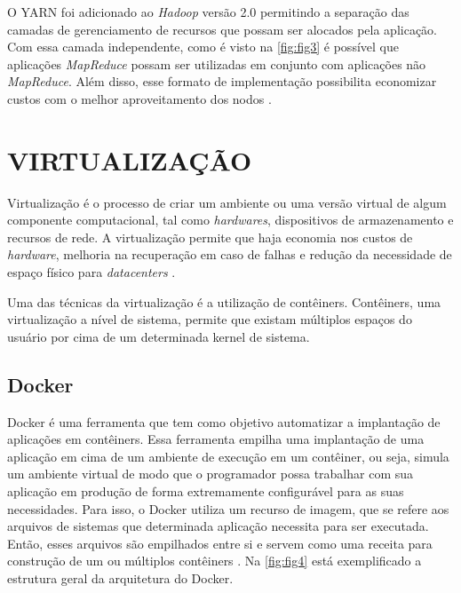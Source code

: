 O YARN foi adicionado ao \textit{Hadoop} versão 2.0 permitindo a separação das camadas de gerenciamento de recursos que possam ser alocados pela aplicação. Com essa camada independente, como é visto na \autoref{fig:fig3} é possível que aplicações \textit{MapReduce} possam ser utilizadas em conjunto com aplicações não \textit{MapReduce}. Além disso, esse formato de implementação possibilita economizar custos com o melhor aproveitamento dos nodos \cite{KobylinskaMartins14}. 


\newpage
\section{VIRTUALIZAÇÃO} \label{sec:virtualizacao}

Virtualização é o processo de criar um ambiente ou uma versão virtual de algum componente computacional, tal como \textit{hardwares}, dispositivos de armazenamento e recursos de rede. A virtualização permite que haja economia nos custos de \textit{hardware}, melhoria na recuperação em caso de falhas e redução da necessidade de espaço físico para \textit{datacenters} \cite{PortnoyVirtualization12}. 

Uma das técnicas da virtualização é a utilização de contêiners. Contêiners, uma virtualização a nível de sistema, permite que existam múltiplos espaços do usuário por cima de um determinada kernel de sistema. 

\subsection{Docker} \label{ssec:docker}

Docker é uma ferramenta que tem como objetivo automatizar a implantação de aplicações em contêiners. Essa ferramenta empilha uma implantação de uma aplicação em cima de um ambiente de execução em um contêiner, ou seja, simula um ambiente virtual de modo que o programador possa trabalhar com sua aplicação em produção de forma extremamente configurável para as suas necessidades. Para isso, o Docker utiliza um recurso de imagem, que se refere aos arquivos de sistemas que determinada aplicação necessita para ser executada. Então, esses arquivos são empilhados entre si e servem como uma receita para construção de um ou múltiplos contêiners \cite{DockerBook14}. Na \autoref{fig:fig4} está exemplificado a estrutura geral da arquitetura do Docker.


